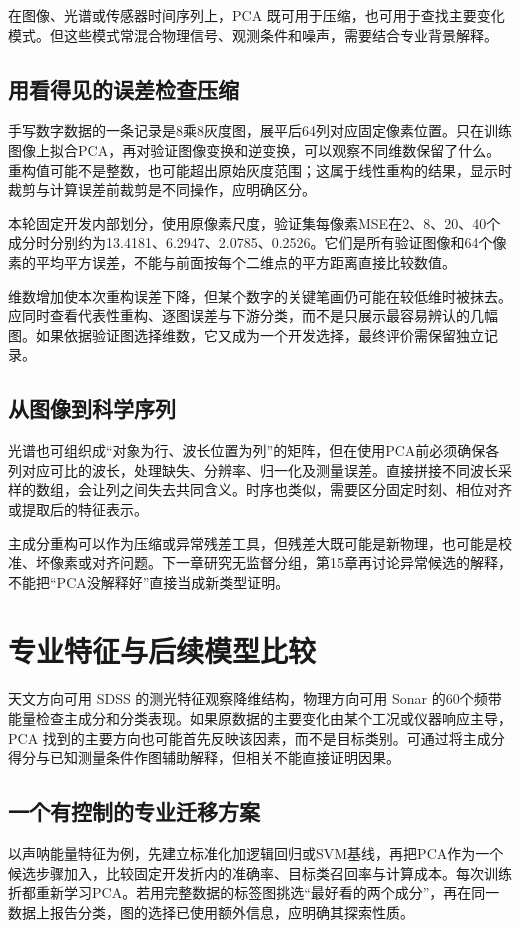 
在图像、光谱或传感器时间序列上，PCA 既可用于压缩，也可用于查找主要变化模式。但这些模式常混合物理信号、观测条件和噪声，需要结合专业背景解释。

\subsection{用看得见的误差检查压缩}
手写数字数据的一条记录是8乘8灰度图，展平后64列对应固定像素位置。只在训练图像上拟合PCA，再对验证图像变换和逆变换，可以观察不同维数保留了什么。重构值可能不是整数，也可能超出原始灰度范围；这属于线性重构的结果，显示时裁剪与计算误差前裁剪是不同操作，应明确区分。

本轮固定开发内部划分，使用原像素尺度，验证集每像素MSE在2、8、20、40个成分时分别约为13.4181、6.2947、2.0785、0.2526。它们是所有验证图像和64个像素的平均平方误差，不能与前面按每个二维点的平方距离直接比较数值。

维数增加使本次重构误差下降，但某个数字的关键笔画仍可能在较低维时被抹去。应同时查看代表性重构、逐图误差与下游分类，而不是只展示最容易辨认的几幅图。如果依据验证图选择维数，它又成为一个开发选择，最终评价需保留独立记录。

\subsection{从图像到科学序列}
光谱也可组织成“对象为行、波长位置为列”的矩阵，但在使用PCA前必须确保各列对应可比的波长，处理缺失、分辨率、归一化及测量误差。直接拼接不同波长采样的数组，会让列之间失去共同含义。时序也类似，需要区分固定时刻、相位对齐或提取后的特征表示。

主成分重构可以作为压缩或异常残差工具，但残差大既可能是新物理，也可能是校准、坏像素或对齐问题。下一章研究无监督分组，第15章再讨论异常候选的解释，不能把“PCA没解释好”直接当成新类型证明。

\section{专业特征与后续模型比较}
天文方向可用 SDSS 的测光特征观察降维结构，物理方向可用 Sonar 的60个频带能量检查主成分和分类表现。如果原数据的主要变化由某个工况或仪器响应主导，PCA 找到的主要方向也可能首先反映该因素，而不是目标类别。可通过将主成分得分与已知测量条件作图辅助解释，但相关不能直接证明因果。

\subsection{一个有控制的专业迁移方案}
以声呐能量特征为例，先建立标准化加逻辑回归或SVM基线，再把PCA作为一个候选步骤加入，比较固定开发折内的准确率、目标类召回率与计算成本。每次训练折都重新学习PCA。若用完整数据的标签图挑选“最好看的两个成分”，再在同一数据上报告分类，图的选择已使用额外信息，应明确其探索性质。

